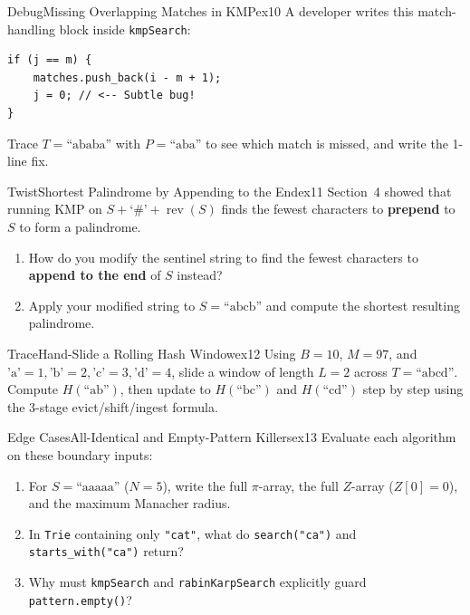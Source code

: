 \documentclass[11pt,a4paper]{article}
\theoremstyle{definition}
\begin{document}
\begin{tryitbox}{Debug}{Missing Overlapping Matches in KMP}{ex10}
A developer writes this match-handling block inside \texttt{kmpSearch}:
\begin{lstlisting}[numbers=none, xleftmargin=4pt, framexleftmargin=4pt]
if (j == m) {
    matches.push_back(i - m + 1);
    j = 0; // <-- Subtle bug!
}
\end{lstlisting}
Trace $T = \text{``ababa''}$ with $P = \text{``aba''}$ to see which match is missed, and write the 1-line fix.
\end{tryitbox}

\begin{tryitbox}{Twist}{Shortest Palindrome by Appending to the End}{ex11}
Section~4 showed that running KMP on $S + \text{`\#'} + \operatorname{rev}(S)$ finds the fewest characters to \textbf{prepend} to $S$ to form a palindrome.
\begin{enumerate}
    \item How do you modify the sentinel string to find the fewest characters to \textbf{append to the end} of $S$ instead?
    \item Apply your modified string to $S = \text{``abcb''}$ and compute the shortest resulting palindrome.
\end{enumerate}
\end{tryitbox}

\begin{tryitbox}{Trace}{Hand-Slide a Rolling Hash Window}{ex12}
Using $B = 10$, $M = 97$, and $\text{'a'}=1, \text{'b'}=2, \text{'c'}=3, \text{'d'}=4$, slide a window of length $L = 2$ across $T = \text{``abcd''}$. Compute $H(\text{``ab''})$, then update to $H(\text{``bc''})$ and $H(\text{``cd''})$ step by step using the 3-stage evict/shift/ingest formula.
\end{tryitbox}

\begin{tryitbox}{Edge Cases}{All-Identical and Empty-Pattern Killers}{ex13}
Evaluate each algorithm on these boundary inputs:
\begin{enumerate}
    \item For $S = \text{``aaaaa''}$ ($N = 5$), write the full $\pi$-array, the full $Z$-array ($Z[0]=0$), and the maximum Manacher radius.
    \item In \texttt{Trie} containing only \texttt{"cat"}, what do \texttt{search("ca")} and \texttt{starts\_with("ca")} return?
    \item Why must \texttt{kmpSearch} and \texttt{rabinKarpSearch} explicitly guard \texttt{pattern.empty()}?
\end{enumerate}
\end{tryitbox}
\end{document}
